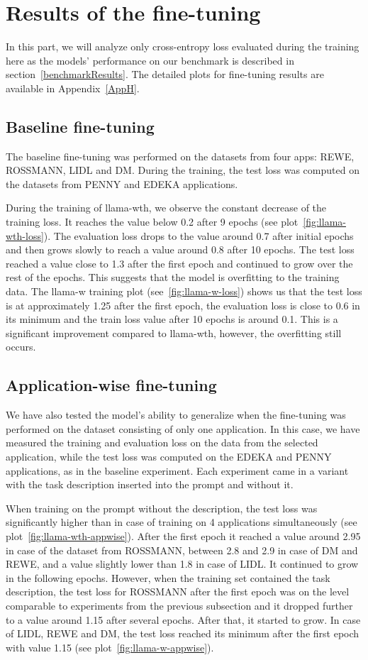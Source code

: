 \documentclass[licencjacka,en]{pracamgr}
\begin{document}
\section{Results of the fine-tuning}
In this part, we will analyze only cross-entropy loss evaluated during the training here as the models' performance on our benchmark is described in section~\ref{benchmarkResults}. The detailed plots for fine-tuning results are available in Appendix~\ref{AppH}.
\subsection{Baseline fine-tuning}
The baseline fine-tuning was performed on the datasets from four apps: REWE, ROSSMANN, LIDL and DM. During the training, the test loss was computed on the datasets from PENNY and EDEKA applications.

During the training of llama-wth, we observe the constant decrease of the training loss. It reaches the value below 0.2 after 9 epochs (see plot~\ref{fig:llama-wth-loss}). The evaluation loss drops to the value around 0.7 after initial epochs and then grows slowly to reach a value around 0.8 after 10 epochs. The test loss reached a value close to 1.3 after the first epoch and continued to grow over the rest of the epochs. This suggests that the model is overfitting to the training data.
The llama-w training plot (see~\ref{fig:llama-w-loss}) shows us that the test loss is at approximately 1.25 after the first epoch, the evaluation loss is close to 0.6 in its minimum and the train loss value after 10 epochs is around 0.1. This is a significant improvement compared to llama-wth, however, the overfitting still occurs.

\subsection{Application-wise fine-tuning}
We have also tested the model's ability to generalize when the fine-tuning was performed on the dataset consisting of only one application. In this case, we have measured the training and evaluation loss on the data from the selected application, while the test loss was computed on the EDEKA and PENNY applications, as in the baseline experiment. Each experiment came in a variant with the task description inserted into the prompt and without it.

When training on the prompt without the description, the test loss was significantly higher than in case of training on 4 applications simultaneously (see plot~\ref{fig:llama-wth-appwise}). After the first epoch it reached a value around 2.95 in case of the dataset from ROSSMANN, between 2.8 and 2.9 in case of DM and REWE, and a value slightly lower than 1.8 in case of LIDL. It continued to grow in the following epochs.
However, when the training set contained the task description, the test loss for ROSSMANN after the first epoch was on the level comparable to experiments from the previous subsection and it dropped further to a value around 1.15 after several epochs. After that, it started to grow. In case of LIDL, REWE and DM, the test loss reached its minimum after the first epoch with value 1.15 (see plot~\ref{fig:llama-w-appwise}).
\end{document}
